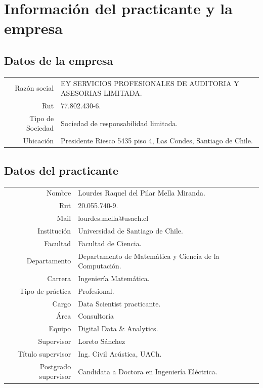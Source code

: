 \documentclass{article}[14pts]
\begin{document}

\tableofcontents
\newpage

\section{Información del practicante y la empresa}

  \subsection{Datos de la empresa}

    \begin{tabular}{r l}
        Razón social & EY SERVICIOS PROFESIONALES DE AUDITORIA Y ASESORIAS LIMITADA.\\
        Rut & 77.802.430-6.\\
      Tipo de Sociedad & Sociedad de responsabilidad limitada.\\
      Ubicación & Presidente Riesco 5435 piso 4, Las Condes, Santiago de Chile.\\

    \end{tabular}

  \subsection{Datos del practicante}

    \begin{tabular}{r l}
      Nombre & Lourdes Raquel del Pilar Mella Miranda.\\ 
      Rut & 20.055.740-9.\\
      Mail & lourdes.mella@usach.cl\\
      Institución & Universidad de Santiago de Chile.\\
      Facultad & Facultad de Ciencia.\\
      Departamento & Departamento de Matemática y Ciencia de la Computación.\\
      Carrera & Ingeniería Matemática.\\
      Tipo de práctica & Profesional.\\
      Cargo & Data Scientist practicante.\\
      Área & Consultoría\\
      Equipo & Digital Data \& Analytics.\\
      Supervisor & Loreto Sánchez\\
      Título supervisor & Ing. Civil Acústica, UACh.\\
      Postgrado supervisor & Candidata a Doctora en Ingeniería Eléctrica.

    \end{tabular}
\end{document}
